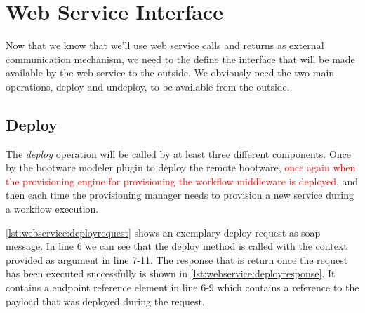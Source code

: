\section{Web Service Interface}

Now that we know that we'll use web service calls and returns as external communication mechanism, we need to the define the interface that will be made available by the web service to the outside.
We obviously need the two main operations, deploy and undeploy, to be available from the outside.

\subsection{Deploy}

The \textit{deploy} operation will be called by at least three different components.
Once by the bootware modeler plugin to deploy the remote bootware, \textcolor{red}{once again when the provisioning engine for provisioning the workflow middleware is deployed}, and then each time the provisioning manager needs to provision a new service during a workflow execution.

\vspace*{\baselineskip}

\autoref{lst:webservice:deployrequest} shows an exemplary deploy request as soap message.
In line 6 we can see that the deploy method is called with the context provided as argument in line 7-11.
The response that is return once the request has been executed successfully is shown in \autoref{lst:webservice:deployresponse}.
It contains a endpoint reference element in line 6-9 which contains a reference to the payload that was deployed during the request.

\vspace*{\baselineskip}

